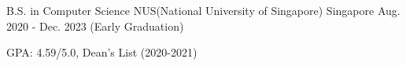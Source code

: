 

\begin{cventries}

  \cventry
    {B.S. in Computer Science} %
    {NUS(National University of Singapore)} %
    {Singapore} %
    {Aug. 2020 - Dec. 2023 (Early Graduation)} %
    {
      \begin{cvitems} %
      \item {GPA: 4.59/5.0, Dean's List (2020-2021)}
      \end{cvitems}
    }


\end{cventries}
